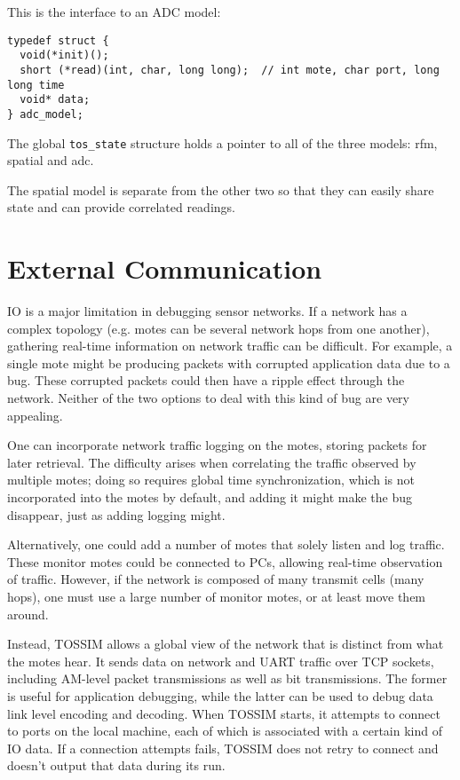 \documentclass[12pt]{article}
\begin{document}
This is the interface to an ADC model:

\begin{verbatim}
typedef struct {
  void(*init)();
  short (*read)(int, char, long long);  // int mote, char port, long long time
  void* data;                
} adc_model;
\end{verbatim}

The global {\tt tos\_state} structure holds a pointer to all of the
three models: rfm, spatial and adc.

The spatial model is separate from the other two so that they can
easily share state and can provide correlated readings.

\section*{External Communication}

IO is a major limitation in debugging sensor networks. If a network
has a complex topology (e.g. motes can be several network hops from
one another), gathering real-time information on network traffic can
be difficult. For example, a single mote might be producing packets
with corrupted application data due to a bug. These corrupted packets
could then have a ripple effect through the network. Neither of the
two options to deal with this kind of bug are very appealing.

One can incorporate network traffic logging on the motes, storing
packets for later retrieval. The difficulty arises when correlating
the traffic observed by multiple motes; doing so requires global time
synchronization, which is not incorporated into the motes by default,
and adding it might make the bug disappear, just as adding logging might. 

Alternatively, one could add a number of motes that solely listen and
log traffic. These monitor motes could be connected to PCs, allowing
real-time observation of traffic. However, if the network is composed
of many transmit cells (many hops), one must use a large number of
monitor motes, or at least move them around.

Instead, TOSSIM allows a global view of the network that is distinct
from what the motes hear. It sends data on network and UART traffic
over TCP sockets, including AM-level packet transmissions as well as
bit transmissions. The former is useful for application debugging,
while the latter can be used to debug data link level encoding and
decoding. When TOSSIM starts, it attempts to connect to ports on the
local machine, each of which is associated with a certain kind of IO
data. If a connection attempts fails, TOSSIM does not retry to connect
and doesn't output that data during its run.
\end{document}
